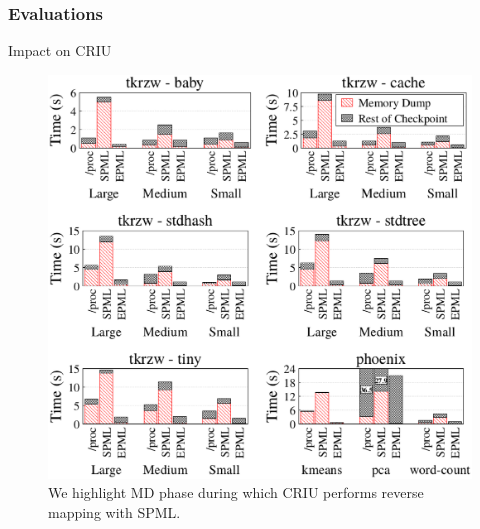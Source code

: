 \documentclass[xcolor=table,bigger,unknownkeysallowed]{beamer}
\begin{document}
        \begin{frame}
                \frametitle{Evaluations}
				\begin{block}{Impact on CRIU}
\begin{figure}[!htp]
	\centering 
	\includegraphics[width=.45\linewidth]{fig/criu-results-tracker}
	\caption{\scriptsize We highlight MD phase during which CRIU performs reverse mapping with SPML.}
	\label{fig:criu-results-tracker}
\end{figure}											
			\end{block}
        \end{frame}        
\end{document}
